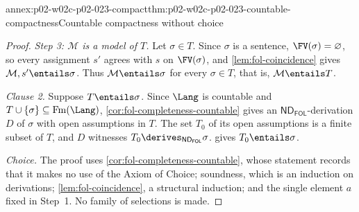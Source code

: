 \begin{annexitem}{annex:p02-w02c-p02-023-compact}{thm:p02-w02c-p02-023-countable-compactness}{Countable compactness without choice}
\begin{proof}
\emph{Step 3: \(\mathcal M\) is a model of \(T\).}  Let \(\sigma\in T\).  Since
\(\sigma\) is a sentence, \(\FV(\sigma)=\varnothing\), so every assignment
\(s'\) agrees with \(s\) on \(\FV(\sigma)\), and \cref{lem:fol-coincidence}
gives \(\mathcal M,s'\entails\sigma\).  Thus \(\mathcal M\entails\sigma\) for every
\(\sigma\in T\), that is, \(\mathcal M\entails T\).

\emph{Clause 2.}  Suppose \(T\entails\sigma\).  Since \(\Lang\) is countable
and \(T\cup\{\sigma\}\subseteq\operatorname{Fm}(\Lang)\),
\cref{cor:fol-completeness-countable} gives an \(\mathsf{ND}_{\mathsf{FOL}}\)-derivation
\(D\) of \(\sigma\) with open assumptions in \(T\).  The set \(T_0\) of its
open assumptions is a finite subset of \(T\), and \(D\) witnesses
\(T_0\derives_{\mathsf{ND}_{\mathsf{FOL}}}\sigma\).   gives
\(T_0\entails\sigma\).

\emph{Choice.}  The proof uses \cref{cor:fol-completeness-countable}, whose
statement records that it makes no use of the Axiom of Choice; soundness,
which is an induction on derivations; \cref{lem:fol-coincidence}, a
structural induction; and the single element \(a\) fixed in Step~1.  No
family of selections is made.
\end{proof}
\end{annexitem}

